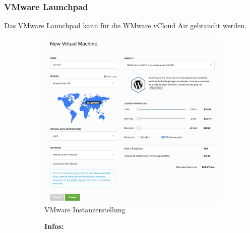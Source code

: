\subsubsection{VMware Launchpad\autocite{vmware}}
Das VMware Launchpad kann für die WMware vCloud Air gebraucht werden.
\begin{figure}[!htbp]
   \begin{subfigure}[b]{.6\textwidth}

\includegraphics[width=\textwidth]{./03_Analyse/03_Bitnami/images/vmware_creation}
\caption{VMware Instanzerstellung}
   \end{subfigure}
     \hfill
   \begin{subfigure}[b]{.39\textwidth}
  \centering
\textbf{Infos:}\\

\end{subfigure}
\end{figure}

